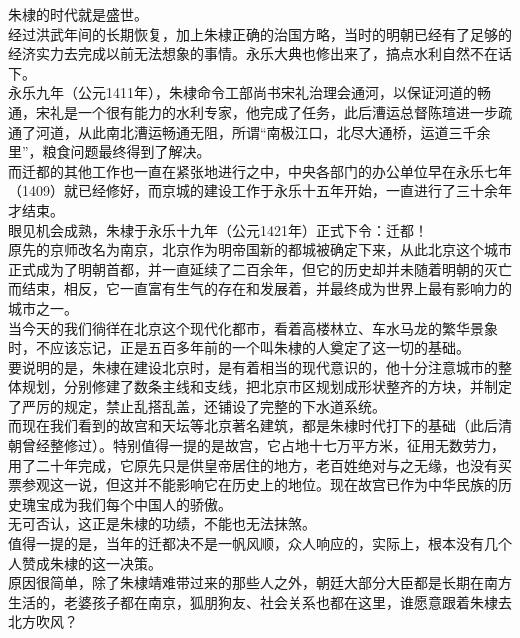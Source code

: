 \begin{multicols}{\theparacolNo}
朱棣的时代就是盛世。\\

经过洪武年间的长期恢复，加上朱棣正确的治国方略，当时的明朝已经有了足够的经济实力去完成以前无法想象的事情。永乐大典也修出来了，搞点水利自然不在话下。\\

永乐九年（公元1411年），朱棣命令工部尚书宋礼治理会通河，以保证河道的畅通，宋礼是一个很有能力的水利专家，他完成了任务，此后漕运总督陈瑄进一步疏通了河道，从此南北漕运畅通无阻，所谓“南极江口，北尽大通桥，运道三千余里”，粮食问题最终得到了解决。\\

而迁都的其他工作也一直在紧张地进行之中，中央各部门的办公单位早在永乐七年（1409）就已经修好，而京城的建设工作于永乐十五年开始，一直进行了三十余年才结束。\\

眼见机会成熟，朱棣于永乐十九年（公元1421年）正式下令：迁都！\\

原先的京师改名为南京，北京作为明帝国新的都城被确定下来，从此北京这个城市正式成为了明朝首都，并一直延续了二百余年，但它的历史却并未随着明朝的灭亡而结束，相反，它一直富有生气的存在和发展着，并最终成为世界上最有影响力的城市之一。\\

当今天的我们徜徉在北京这个现代化都市，看着高楼林立、车水马龙的繁华景象时，不应该忘记，正是五百多年前的一个叫朱棣的人奠定了这一切的基础。\\

要说明的是，朱棣在建设北京时，是有着相当的现代意识的，他十分注意城市的整体规划，分别修建了数条主线和支线，把北京市区规划成形状整齐的方块，并制定了严厉的规定，禁止乱搭乱盖，还铺设了完整的下水道系统。\\

而现在我们看到的故宫和天坛等北京著名建筑，都是朱棣时代打下的基础（此后清朝曾经整修过）。特别值得一提的是故宫，它占地十七万平方米，征用无数劳力，用了二十年完成，它原先只是供皇帝居住的地方，老百姓绝对与之无缘，也没有买票参观这一说，但这并不能影响它在历史上的地位。现在故宫已作为中华民族的历史瑰宝成为我们每个中国人的骄傲。\\

无可否认，这正是朱棣的功绩，不能也无法抹煞。\\

值得一提的是，当年的迁都决不是一帆风顺，众人响应的，实际上，根本没有几个人赞成朱棣的这一决策。\\

原因很简单，除了朱棣靖难带过来的那些人之外，朝廷大部分大臣都是长期在南方生活的，老婆孩子都在南京，狐朋狗友、社会关系也都在这里，谁愿意跟着朱棣去北方吹风？\\


\end{multicols}
